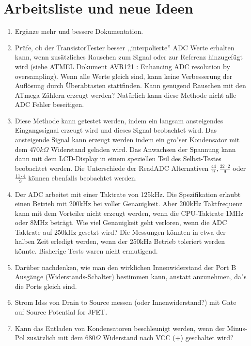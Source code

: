 
\chapter{Arbeitsliste und neue Ideen}
\label{sec:todo}

\begin{enumerate}
\item Erg\"anze mehr und bessere Dokumentation.
\item Pr\"ufe, ob der TransistorTester besser ,,interpolierte''  ADC Werte erhalten kann, wenn zus\"atz\-liches Rauschen zum Signal
oder zur Referenz hinzugef\"ugt wird (siehe ATMEL Dokument AVR121 \cite{AVR121}: Enhancing ADC resolution by oversampling).
Wenn alle Werte gleich sind, kann keine Verbesserung der Aufl\"osung durch \"Uberabtasten stattfinden.
Kann gen\"ugend Rauschen mit den ATmega Z\"ahlern erzeugt werden?
Nat\"urlich kann diese Methode nicht alle ADC Fehler beseitigen.
\item Diese Methode kann getestet werden, indem ein langsam ansteigendes Eingangssignal erzeugt wird und dieses
Signal beobachtet wird.
Das ansteigende Signal kann erzeugt werden indem ein gro"ser Kondensator mit dem \(470k\Omega\) Widerstand geladen wird.
Das Anwachsen der Spannung kann dann mit dem LCD-Display in einem speziellen Teil des Selbst-Testes beobachtet werden.
Die Unterschiede der ReadADC Alternativen \(\frac{44}{9}, \frac{22\cdot2}{9}\) oder \(\frac{11\cdot4}{9}\) k\"onnen
ebenfalls beobachtet werden.
\item Der ADC arbeitet mit einer Taktrate von 125kHz. Die Spezifikation erlaubt einen Betrieb mit 200kHz bei voller Genauigkeit.
Aber 200kHz Taktfrequenz kann mit dem Vorteiler nicht erzeugt werden, wenn die CPU-Taktrate 1MHz oder 8MHz betr\"agt.
Wie viel Genauigkeit geht verloren, wenn die ADC Taktrate auf 250kHz gesetzt wird?
Die Messungen k\"onnten in etwa der halben Zeit erledigt werden, wenn der 250kHz Betrieb toleriert werden k\"onnte.
Bisherige Tests waren nicht ermutigend.
\item Dar\"uber nachdenken, wie man den wirklichen Innenwiderstand der Port B Aus\-g\"an\-ge (Wider\-stands-Schal\-ter) bestimmen kann,
anstatt anzunehmen, da"s die Ports gleich sind.
\item Strom Idss von Drain to Source messen (oder Innenwiderstand?) mit Gate auf Source Potential for JFET.
\item Kann das Entladen von Kondensatoren beschleunigt werden, wenn der Minus-Pol zus\"atzlich mit dem \(680\Omega\) 
Widerstand nach VCC (+) geschaltet wird?

\end{enumerate}
